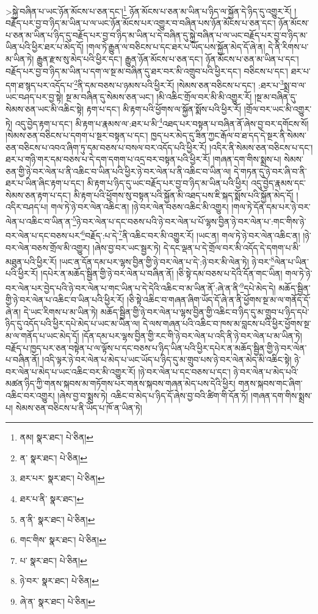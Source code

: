 >སྐྱེ་བཞིན་པ་ཡང་ཉོན་མོངས་པ་ཅན་དང་།\footnote{ནམ།  སྣར་ཐང་།  པེ་ཅིན། } ཉོན་མོངས་པ་ཅན་མ་ཡིན་པ་ཉིད་ལ་སྐྱོན་དེ་ཉིད་དུ་འགྱུར་རོ། །བརྗོད་པར་བྱ་བ་ཉིད་མ་ཡིན་པ་ལ་ཡང་ཉོན་མོངས་པར་འགྱུར་བ་བཞིན་པས་ཉོན་མོངས་པ་ཅན་དང་། ཉོན་མོངས་པ་ཅན་མ་ཡིན་པ་ཉིད་དུ་བརྗོད་པར་བྱ་བ་ཉིད་མ་ཡིན་པ་དེ་བཞིན་དུ་སྐྱེ་བཞིན་པ་ལ་ཡང་བརྗོད་པར་བྱ་བ་ཉིད་མ་ཡིན་པའི་ཕྱིར་ཐར་པ་མེད་དོ། །གལ་ཏེ་རྒྱུན་ལ་བཅིངས་པ་དང་ཐར་པ་ཡོད་པས་སྐྱོན་མེད་དོ་ཞེ་ན། དེ་ནི་རིགས་པ་མ་ཡིན་ཏེ། རྒྱུན་རྫས་སུ་མེད་པའི་ཕྱིར་དང་། རྒྱུན་ཉོན་མོངས་པ་ཅན་དང་། ཉོན་མོངས་པ་ཅན་མ་ཡིན་པ་དང་། བརྗོད་པར་བྱ་བ་ཉིད་མ་ཡིན་པ་དག་ལ་སྔ་མ་བཞིན་དུ་ཐར་བར་མི་འགྲུབ་པའི་ཕྱིར་དང་། བཅིངས་པ་དང་། ཐར་པ་དག་ཐ་སྙད་པར་འདོད་པ་\footnote{ན་  སྣར་ཐང་།  པེ་ཅིན། }ནི་དམ་བཅས་པ་ཉམས་པའི་ཕྱིར་རོ། །སེམས་ཅན་བཅིངས་པ་དང་། :ཐར་པ་\footnote{ཐར་པར་  སྣར་ཐང་།  པེ་ཅིན། }སྨྲ་བ་ལ་ཡང་བཤད་པར་བྱ་སྟེ། སྔ་མ་བཞིན་དུ་སེམས་ཅན་ཡང་། །མི་འཆིང་གྲོལ་བར་མི་མི་འགྱུར་རོ། །སྔ་མ་བཞིན་དུ་སེམས་ཅན་ཡང་མི་འཆིང་སྟེ། རྟག་པ་དང་། མི་རྟག་པའི་ཕྱོགས་ལ་སྐྱོན་སྨོས་པའི་ཕྱིར་རོ། །གྲོལ་བར་ཡང་མི་འགྱུར་ཏེ། འདུ་བྱེད་རྟག་པ་དང་། མི་རྟག་པ་རྣམས་ལ་:ཐར་པ་མི་\footnote{ཐར་པ་ནི་  སྣར་ཐང་། }འཐད་པར་བསྟན་པ་བཞིན་ནོ་ཞེས་བྱ་བར་དགོངས་སོ། །སེམས་ཅན་བཅིངས་པ་དགག་པ་སྔར་བསྟན་པ་དང་། ཁྱད་པར་མེད་དུ་ཟིན་ཀྱང་རྒོལ་བ་ཐ་དད་དེ་སྔར་ནི་སེམས་ཅན་བཅིངས་པ་འབའ་ཞིག་ཏུ་དམ་བཅས་པ་བསལ་བར་འདོད་པའི་ཕྱིར་རོ། །འདིར་ནི་སེམས་ཅན་བཅིངས་པ་དང་། ཐར་པ་གཉི་གར་དམ་བཅས་པ་དེ་དག་དགག་པ་འདྲ་བར་བསྟན་པའི་ཕྱིར་རོ། །གཞན་དག་གིས་སྨྲས་པ། སེམས་ཅན་གྱི་ཉེ་བར་ལེན་པ་ནི་འཆིང་བ་ཡིན་པའི་ཕྱིར་ཉེ་བར་ལེན་པ་ནི་འཆིང་བ་ཡིན་ལ། དེ་གཏན་དུ་ཉེ་བར་ཞི་བ་ནི་ཐར་པ་ཡིན་ཞིང་རྟག་པ་དང་། མི་རྟག་པ་ཉིད་དུ་ཡང་བརྗོད་པར་བྱ་བ་ཉིད་མ་ཡིན་པའི་ཕྱིར། འདུ་བྱེད་རྣམས་དང་སེམས་ཅན་རྟག་པ་དང་། མི་རྟག་པའི་ཕྱོགས་སུ་བསྟན་པའི་སྐྱོན་མི་འཐད་པས་ཇི་སྐད་སྨོས་པའི་སྐྱོན་མེད་དོ། །འདིར་བཤད་པ། གལ་ཏེ་ཉེ་བར་ལེན་འཆིང་ན། །ཉེ་བར་ལེན་བཅས་འཆིང་མི་འགྱུར། །གལ་ཏེ་དོན་དམ་པར་ཉེ་བར་ལེན་པ་འཆིང་བ་ཡིན་ན་\footnote{ན་ནི་  སྣར་ཐང་།  པེ་ཅིན། }ཉེ་བར་ལེན་པ་དང་བཅས་པའི་ཉེ་བར་ལེན་པ་པོ་ལྷས་བྱིན་ཉེ་བར་ལེན་པ་:གང་གིས་ཉེ་བར་ལེན་པ་དང་བཅས་པར་\footnote{གང་གིས་  སྣར་ཐང་།  པེ་ཅིན། }བརྗོད་:པ་དེ་\footnote{པ་  སྣར་ཐང་།  པེ་ཅིན། }ནི་འཆིང་བར་མི་འགྱུར་རོ། །ཡང་ན། གལ་ཏེ་ཉེ་བར་ལེན་འཆིང་ན། །ཉེ་བར་ལེན་བཅས་གྲོལ་མི་འགྱུར། །ཞེས་བྱ་བར་ཡང་སྦྱར་ཏེ། དེ་དང་ལྡན་པ་དེ་གྲོལ་བར་མི་འདོད་དེ་དགག་པ་མི་མཐུན་པའི་ཕྱིར་རོ། །ཡང་ན་དོན་དམ་པར་ལྷས་བྱིན་གྱི་ཉེ་བར་ལེན་པ་དེ་:ཉེ་བར་མི་ལེན་ཏེ། ཉེ་བར་\footnote{ཉེ་བར་  སྣར་ཐང་།  པེ་ཅིན། }ལེན་པ་ཡིན་པའི་ཕྱིར་རོ། །དཔེར་ན་མཆོད་སྦྱིན་གྱི་ཉེ་བར་ལེན་པ་བཞིན་ནོ། །ཅི་སྟེ་དམ་བཅས་པ་དེའི་དོན་གང་ཡིན། གལ་ཏེ་ཉེ་བར་ལེན་པར་བྱེད་པའི་ཉེ་བར་ལེན་པ་གང་ཡིན་པ་དེ་དེའི་འཆིང་བ་མ་ཡིན་ནོ་:ཞེ་ན་ནི་\footnote{ཞེ་ན་  སྣར་ཐང་།  པེ་ཅིན། }དཔེ་མེད་དེ། མཆོད་སྦྱིན་གྱི་ཉེ་བར་ལེན་པ་འཆིང་བ་ཡིན་པའི་ཕྱིར་རོ། །ཅི་སྟེ་འཆིང་བ་གཞན་ཞིག་ཡོད་དོ་ཞེ་ན་ནི་ཕྱོགས་སྔ་མ་ལ་གནོད་དོ་ཞེ་ན། དེ་ཡང་རིགས་པ་མ་ཡིན་ཏེ། མཆོད་སྦྱིན་གྱི་ཉེ་བར་ལེན་པ་ལྷས་བྱིན་གྱི་འཆིང་བ་ཉིད་དུ་མ་གྲུབ་པ་ཉིད་དཔེ་ཉིད་དུ་འདོད་པའི་ཕྱིར་དཔེ་མེད་པ་ཡང་མ་ཡིན་ལ། དེ་ལས་གཞན་པའི་འཆིང་བ་ཁས་མ་བླངས་པའི་ཕྱིར་ཕྱོགས་སྔ་མ་ལ་གནོད་པ་ཡང་མེད་དོ། །དོན་དམ་པར་ལྷས་བྱིན་གྱི་རང་གི་ཉེ་བར་ལེན་པ་འདི་ནི་ཉེ་བར་ལེན་པ་མ་ཡིན་ཏེ། བརྗོད་པ་ཁྱད་པར་ཅན་བསྟེན་པ་ལ་ལྟོས་པ་དང་བཅས་པ་ཉིད་ཡིན་པའི་ཕྱིར་དཔེར་ན་མཆོད་སྦྱིན་གྱི་ཉེ་བར་ལེན་པ་བཞིན་ནོ། །འདི་ལྟར་ཉེ་བར་ལེན་པ་མེད་པ་ཡང་ཡོད་པ་ཉིད་དུ་མ་གྲུབ་པས་ཉེ་བར་ལེན་མེད་མི་འཆིང་སྟེ། ཉེ་བར་ལེན་པ་མེད་པ་ཡང་འཆིང་བར་མི་འགྱུར་རོ། །ཉེ་བར་ལེན་པ་དང་བཅས་པ་དང་། ཉེ་བར་ལེན་པ་མེད་པའི་མཚན་ཉིད་ཀྱི་གནས་སྐབས་མ་གཏོགས་པར་གནས་སྐབས་གཞན་མེད་པས་དེའི་ཕྱིར། གནས་སྐབས་གང་ཞིག་འཆིང་བར་འགྱུར། །ཞེས་བྱ་བ་སྨྲས་ཏེ། འཆིང་བ་མེད་པ་ཉིད་དོ་ཞེས་བྱ་བའི་ཚིག་གི་དོན་ཏོ། །གཞན་དག་གིས་སྨྲས་པ། སེམས་ཅན་བཅིངས་པ་ནི་ཡོད་པ་ཁོ་ན་ཡིན་ཏེ། 